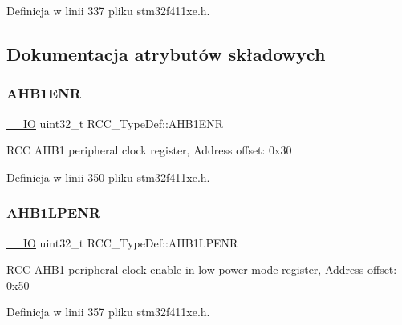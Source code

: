 Definicja w linii 337 pliku stm32f411xe.\+h.



\subsection{Dokumentacja atrybutów składowych}
\mbox{\label{struct_r_c_c___type_def_af58a7ad868f07f8759eac3e31b6fa79e}} 
\subsubsection{\texorpdfstring{A\+H\+B1\+E\+NR}{AHB1ENR}}
{\footnotesize\ttfamily \hyperlink{core__sc300_8h_aec43007d9998a0a0e01faede4133d6be}{\+\_\+\+\_\+\+IO} uint32\+\_\+t R\+C\+C\+\_\+\+Type\+Def\+::\+A\+H\+B1\+E\+NR}

R\+CC A\+H\+B1 peripheral clock register, Address offset\+: 0x30 

Definicja w linii 350 pliku stm32f411xe.\+h.

\mbox{\label{struct_r_c_c___type_def_a89d6c21f02196b7f59bcc30c1061dd87}} 
\subsubsection{\texorpdfstring{A\+H\+B1\+L\+P\+E\+NR}{AHB1LPENR}}
{\footnotesize\ttfamily \hyperlink{core__sc300_8h_aec43007d9998a0a0e01faede4133d6be}{\+\_\+\+\_\+\+IO} uint32\+\_\+t R\+C\+C\+\_\+\+Type\+Def\+::\+A\+H\+B1\+L\+P\+E\+NR}

R\+CC A\+H\+B1 peripheral clock enable in low power mode register, Address offset\+: 0x50 

Definicja w linii 357 pliku stm32f411xe.\+h.

\mbox{\label{struct_r_c_c___type_def_ad6abf71a348744aa3f2b7e8b214c1ca4}} 
